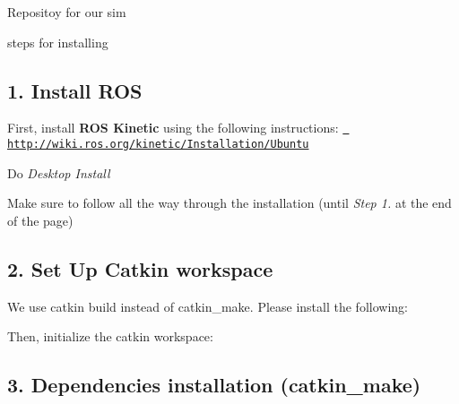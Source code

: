 Repositoy for our sim

steps for installing

\subsection*{1. Install R\+OS}

First, install {\bfseries{R\+OS Kinetic}} using the following instructions\+: \href{http://wiki.ros.org/kinetic/Installation/Ubuntu}{\texttt{ http\+://wiki.\+ros.\+org/kinetic/\+Installation/\+Ubuntu}}

Do {\itshape Desktop Install}

Make sure to follow all the way through the installation (until {\itshape Step 1.} at the end of the page)

\subsection*{2. Set Up Catkin workspace}

We use catkin build instead of catkin\+\_\+make. Please install the following\+: 
\begin{DoxyCode}{0}
\end{DoxyCode}


Then, initialize the catkin workspace\+: 
\begin{DoxyCode}{0}
\end{DoxyCode}


\subsection*{3. Dependencies installation (catkin\+\_\+make)}


\begin{DoxyCode}{0}
\end{DoxyCode}


